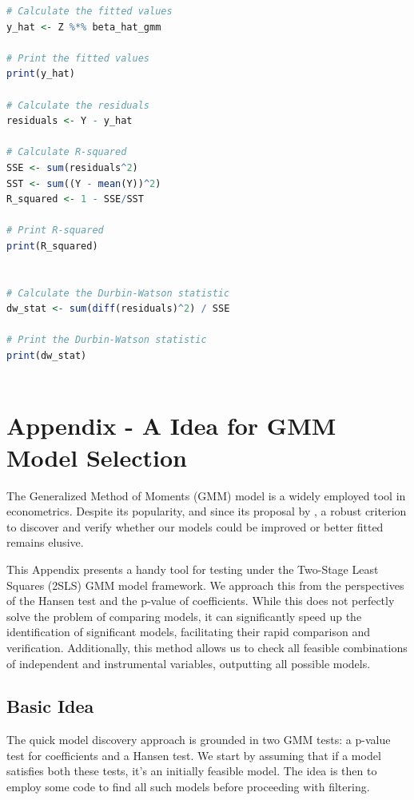 \documentclass[12pt]{article}
\begin{document}
\begin{lstlisting}[language=R]
# Calculate the fitted values
y_hat <- Z %*% beta_hat_gmm

# Print the fitted values
print(y_hat)

# Calculate the residuals
residuals <- Y - y_hat

# Calculate R-squared
SSE <- sum(residuals^2)
SST <- sum((Y - mean(Y))^2)
R_squared <- 1 - SSE/SST

# Print R-squared
print(R_squared)


# Calculate the Durbin-Watson statistic
dw_stat <- sum(diff(residuals)^2) / SSE

# Print the Durbin-Watson statistic
print(dw_stat)



\end{lstlisting}





\newpage
{}
\section{Appendix - A Idea for GMM Model Selection}
\hypertarget{thesentence}{The Generalized Method of Moments (GMM) model is a widely employed tool in econometrics. Despite its popularity, and since its proposal by \cite{hansen1982large}, a robust criterion to discover and verify whether our models could be improved or better fitted remains elusive.} 

This Appendix presents a handy tool for testing under the Two-Stage Least Squares (2SLS) GMM model framework. We approach this from the perspectives of the Hansen test and the p-value of coefficients. While this does not perfectly solve the problem of comparing models, it can significantly speed up the identification of significant models, facilitating their rapid comparison and verification. Additionally, this method allows us to check all feasible combinations of independent and instrumental variables, outputting all possible models.

\subsection{Basic Idea}

The quick model discovery approach is grounded in two GMM tests: a p-value test for coefficients and a Hansen test. We start by assuming that if a model satisfies both these tests, it's an initially feasible model. The idea is then to employ some code to find all such models before proceeding with filtering.
\end{document}
